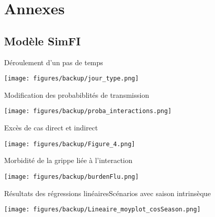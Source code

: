 \section{Annexes}
\subsection{Modèle SimFI}



\begin{frame}{Déroulement d'un pas de temps}
	\begin{center}
	\texttt{[image: figures/backup/jour\_type.png]}
	\end{center}
\end{frame}


\begin{frame}{Modification des probabiblités de transmission}
	\begin{center}
	\texttt{[image: figures/backup/proba\_interactions.png]}
	\end{center}
\end{frame}


\begin{frame}{Excès de cas direct et indirect}
	\begin{center}
	\texttt{[image: figures/backup/Figure\_4.png]}
	\end{center}
\end{frame}


\begin{frame}{Morbidité de la grippe liée à l'interaction}
	\begin{center}
	\texttt{[image: figures/backup/burdenFlu.png]}
	\end{center}
\end{frame}


\begin{frame}{Résultats des régressions linéaires}{Scénarios avec saison intrinsèque}
\vspace{-.4cm}
	\begin{center}
	\texttt{[image: figures/backup/Lineaire\_moyplot\_cosSeason.png]}
	\end{center}
\end{frame}



